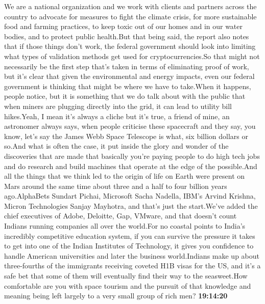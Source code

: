 \documentclass{article}%
\begin{document}
We are a national organization and we work with clients and partners across the country to advocate for measures to fight the climate crisis, for more sustainable food and farming practices, to keep toxic out of our homes and in our water bodies, and to protect public health.But that being said, the report also notes that if those things don't work, the federal government should look into limiting what types of validation methods get used for cryptocurrencies.So that might not necessarily be the first step that's taken in terms of eliminating proof of work, but it's clear that given the environmental and energy impacts, even our federal government is thinking that might be where we have to take.When it happens, people notice, but it is something that we do talk about with the public that when miners are plugging directly into the grid, it can lead to utility bill hikes.Yeah, I mean it's always a cliche but it's true, a friend of mine, an astronomer always says, when people criticise these spacecraft and they say, you know, let's say the James Webb Space Telescope is what, six billion dollars or so.And what is often the case, it put inside the glory and wonder of the discoveries that are made that basically you're paying people to do high tech jobs and do research and build machines that operate at the edge of the possible.And all the things that we think led to the origin of life on Earth were present on Mars around the same time about three and a half to four billion years ago.AlphaBets Sundart Pichai, Microsoft Sacha Nadella, IBM's Arvind Krishna, Micron Technologies Sanjay Mayhotra, and that's just the start.We've added the chief executives of Adobe, Deloitte, Gap, VMware, and that doesn't count Indians running companies all over the world.For no coastal points to India's incredibly competitive education system, if you can survive the pressure it takes to get into one of the Indian Institutes of Technology, it gives you confidence to handle American universities and later the business world.Indians make up about three{-}fourths of the immigrants receiving coveted H1B visas for the US, and it's a safe bet that some of them will eventually find their way to the seasweet.How comfortable are you with space tourism and the pursuit of that knowledge and meaning being left largely to a very small group of rich men?%
\textbf{19:14:20}%
\end{document}
